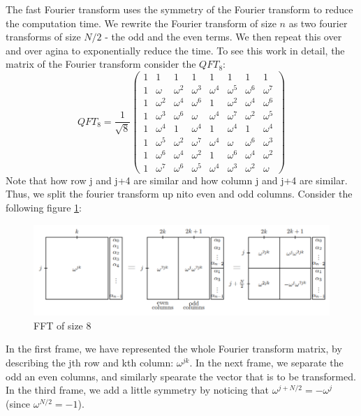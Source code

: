 \documentclass[12pt, oneside]{book}
\theoremstyle{definition}
\theoremstyle{definition}
\theoremstyle{remark}
\begin{document}
The fast Fourier transform uses the symmetry of the Fourier transform to reduce the computation time. 
We rewrite the Fourier transform of size $n$ as two fourier transforms of size $N/2$ - the odd and the even terms. We then repeat this over and over agina to exponentially reduce the time. 
To see this work in detail, the matrix of the Fourier transform consider the $QFT_8$:
\[
QFT_8=\frac{1}{\sqrt{8}}\begin{pmatrix} 1 & 1 & 1 & 1 & 1 & 1 &1 &1 \\ 1 & \omega & \omega^2 & \omega^3 & \omega^4 & \omega^5 & \omega^6 & \omega^7 \\ 1 & \omega^2 & \omega^4 & \omega^6 & 1 & \omega^{2} & \omega^{4} & \omega^{6} \\ 1 & \omega^3 & \omega^6 & \omega & \omega^{4} & \omega^{7} & \omega^{2} & \omega^{5} \\ 1 & \omega^4 & 1 & \omega^{4} & 1 & \omega^{4} & 1 & \omega^{4} \\ 1 & \omega^5 & \omega^{2} & \omega^{7} & \omega^{4} & \omega & \omega^{6} & \omega^{3} \\ 1 & \omega^6 & \omega^{4} & \omega^{2} & 1 & \omega^{6} & \omega^{4} & \omega^{2} \\ 1 & \omega^7 & \omega^{6} & \omega^{5} & \omega^{4} & \omega^{3} & \omega^{2} & \omega \end{pmatrix}
\]
Note that how row j and j+4 are similar and how column j and j+4 are similar. Thus, we split the fourier transform up nito even and odd columns.
Consider the following figure \ref{fig:FFT_8}:
\begin{figure}[H]
    \centering
    \includegraphics[width=\textwidth]{../images/FFT_8.png}
    \caption{FFT of size 8}
    \label{fig:FFT_8}
\end{figure}
In the first frame, we have represented the whole Fourier transform matrix, by describing the jth row and kth column: $\omega^{jk}$.
In the next frame, we separate the odd an even columns, and similarly spearate the vector that is to be transformed. 
In the third frame, we add a little symmetry by noticing that $\omega^{j+N/2}=-\omega^j$ (since $\omega^{N/2}=-1$).
\end{document}
